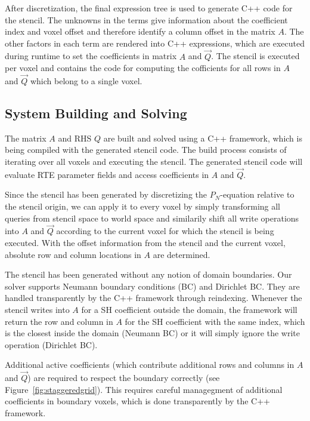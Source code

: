After discretization, the final expression tree is used to generate C++ code for the stencil. The unknowns in the terms give information about the coefficient index and voxel offset and therefore identify a column offset in the matrix $A$. The other factors in each term are rendered into C++ expressions, which are executed during runtime to set the coefficients in matrix $A$ and $\vec{Q}$. The stencil is executed per voxel and contains the code for computing the cofficients for all rows in $A$ and $\vec{Q}$ which belong to a single voxel.

\subsection{System Building and Solving}

The matrix $A$ and RHS $Q$ are built and solved using a C++ framework, which is being compiled with the generated stencil code. The build process consists of iterating over all voxels and executing the stencil. The generated stencil code will evaluate RTE parameter fields and access coefficients in $A$ and $\vec{Q}$.

Since the stencil has been generated by discretizing the $P_N$-equation relative to the stencil origin, we can apply it to every voxel by simply transforming all queries from stencil space to world space and similarily shift all write operations into $A$ and $\vec{Q}$ according to the current voxel for which the stencil is being executed. With the offset information from the stencil and the current voxel, absolute row and column locations in $A$ are determined.

The stencil has been generated without any notion of domain boundaries. Our solver supports Neumann boundary conditions (BC) and Dirichlet BC. They are handled transparently by the C++ framework through reindexing. Whenever the stencil writes into $A$ for a SH coefficient outside the domain, the framework will return the row and column in $A$ for the SH coefficient with the same index, which is the closest inside the domain (Neumann BC) or it will simply ignore the write operation (Dirichlet BC).

Additional active coefficients (which contribute additional rows and columns in $A$ and $\vec{Q}$) are required to respect the boundary correctly (see Figure~\ref{fig:staggeredgrid}). This requires careful managegment of additional coefficients in boundary voxels, which is done transparently by the C++ framework.


